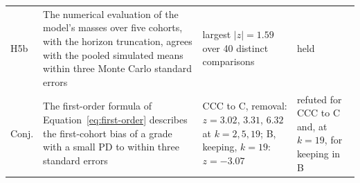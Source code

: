 \begin{table}[htbp]
\begin{tabular}{lp{5.2cm}p{4.2cm}p{2.6cm}}
\relax H5b & \relax The numerical evaluation of the model's masses over five cohorts, with the horizon truncation, agrees with the pooled simulated means within three Monte Carlo standard errors & \relax largest $|z|=1.59$ over 40 distinct comparisons & \relax held \\
\relax Conj. & \relax The first-order formula of Equation~\eqref{eq:first-order} describes the first-cohort bias of a grade with a small PD to within three standard errors & \relax CCC to C, removal: $z=3.02$, $3.31$, $6.32$ at $k=2,5,19$; B, keeping, $k=19$: $z=-3.07$ & \relax refuted for CCC to C and, at $k=19$, for keeping in B \\
\bottomrule
\end{tabular}
\end{table}
